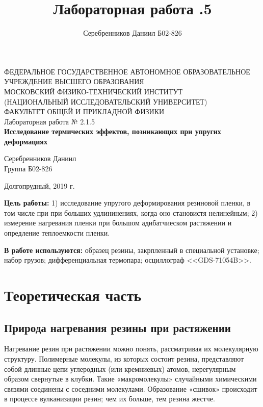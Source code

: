 \documentclass[a4paper,12pt]{article} %
\author{Серебренников Даниил Б02-826}
\title{Лабораторная работа \No 2.1.5}
\begin{document}
\begin{center}
\footnotesize{ФЕДЕРАЛЬНОЕ ГОСУДАРСТВЕННОЕ АВТОНОМНОЕ ОБРАЗОВАТЕЛЬНОЕ 			УЧРЕЖДЕНИЕ ВЫСШЕГО ОБРАЗОВАНИЯ}\\
\footnotesize{МОСКОВСКИЙ ФИЗИКО-ТЕХНИЧЕСКИЙ ИНСТИТУТ\\(НАЦИОНАЛЬНЫЙ 			ИССЛЕДОВАТЕЛЬСКИЙ УНИВЕРСИТЕТ)}\\
\footnotesize{ФАКУЛЬТЕТ ОБЩЕЙ И ПРИКЛАДНОЙ ФИЗИКИ\\}
\hfill \break
\hfill\break
\hfill\break
\hfill \break
\hfill \break
\hfill \break
\hfill \break
\hfill \break
\hfill \break
\hfill \break
\hfill \break
\hfill \break
\hfill \break
\hfill \break
\large{Лабораторная работа № 2.1.5\\\textbf{Исследование термических эффектов, позникающих при упругих деформациях}}\\
\hfill \break
\hfill \break
\hfill \break
\begin{flushright}
	Серебренников Даниил\\
	Группа Б02-826
\end{flushright}
\hfill \break
\hfill \break
\hfill \break
\hfill \break
\hfill \break
\end{center}
\hfill \break
\hfill \break
\hfill \break
\hfill \break
\hfill \break
\hfill \break
\begin{center}
	Долгопрудный, 2019 г.
\end{center}
\thispagestyle{empty} %


\newpage
	\textbf{Цель работы:} 1) исследование упругого деформирования резиновой пленки, в том числе при при больших удлининениях, когда оно становистя нелинейным; 2) измерение нагревания пленки при большом адибатчиеском растяжении и опредление теплоемкости пленки.
	
	\textbf{В работе используются:} образец резины, закрпленный в специальной установке; набор грузов; дифференциальная термопара; осциллограф <<GDS-71054B>>.
	
\section{Теоретическая часть}
	\subsection{Природа нагревания резины при растяжении}
		Нагревание резин при растяжении можно понять, рассматривая их молекулярную структуру. Полимерные молекулы, из которых состоит резина, представляют собой длинные цепи углеродных (или кремниевых) атомов, нерегулярным образом свернутые в клубки. Такие «макромолекулы» случайными химическими связями соединены с соседними молекулами. Образование «сшивок» происходит в процессе вулканизации резин; чем их больше, тем резина жестче.
\end{document}
